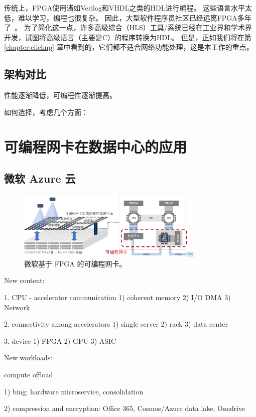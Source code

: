 传统上，FPGA使用诸如Verilog和VHDL之类的HDL进行编程。
这些语言水平太低，难以学习，编程也很复杂。
因此，大型软件程序员社区已经远离FPGA多年了~\cite {bacon2013fpga}。
为了简化这一点，许多高级综合（HLS）工具/系统已经在工业界和学术界开发，试图将高级语言（主要是C）的程序转换为HDL。
但是，正如我们将在第 \ref{chapter:clicknp} 章中看到的，它们都不适合网络功能处理，这是本工作的重点。


\subsection{架构对比}
\label{smartnic-comparison}

性能逐渐降低，可编程性逐渐提高。

如何选择，考虑几个方面：

\section{可编程网卡在数据中心的应用}
\label{background:sec:application}


\subsection{微软 Azure 云}

\begin{figure}[htbp]
	\centering
	\includegraphics[width=0.8\textwidth]{figures/azure_fpga.pdf}
	\caption{微软基于 FPGA 的可编程网卡。}
	\label{background:fig:azure_fpga}
\end{figure}


New content:

1. CPU - accelerator communication
1) coherent memory
2) I/O DMA
3) Network

2. connectivity among accelerators
1) single server
2) rack
3) data center

3. device
1) FPGA
2) GPU
3) ASIC

New workloads:

compute offload

1) bing: hardware microservice, consolidation

2) compression and encryption: Office 365, Cosmos/Azure data lake, Onedrive

